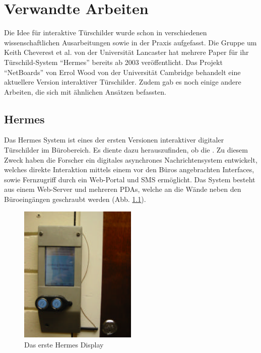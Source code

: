 \chapter{Verwandte Arbeiten}
Die Idee für interaktive Türschilder wurde schon in verschiedenen wissenschaftlichen Ausarbeitungen sowie in der Praxis aufgefasst.
Die Gruppe um Keith Cheverest et al. von der Universität Lancaster hat mehrere Paper für ihr Türschild-System ``Hermes''\cite{cheverest:2003:paper} bereits ab 2003 veröffentlicht.
Das Projekt ``NetBoards'' von Errol Wood\cite{wood:2014} von der Universität Cambridge behandelt eine aktuellere Version interaktiver Türschilder.
Zudem gab es noch einige andere Arbeiten, die sich mit ähnlichen Ansätzen befassten.

\section{Hermes}
Das Hermes System\cite{cheverest:2003:paper}\cite{cheverest:2003:article}\cite{cheveres:2005:hermes-bluetooth} ist eines der ersten Versionen interaktiver digitaler Türschilder im Bürobereich.
Es diente dazu herauszufinden, ob die \cite{cheverest:2003:paper}\cite{cheverest:2003:article}.
Zu diesem Zweck haben die Forscher ein digitales asynchrones Nachrichtensystem entwickelt, welches direkte Interaktion mittels einem vor den Büros angebrachten Interfaces, sowie Fernzugriff durch ein Web-Portal und SMS ermöglicht.
Das System besteht aus einem Web-Server und mehreren PDAs, welche an die Wände neben den Büroeingängen geschraubt werden (Abb. \ref{img:hermesDisplay}).
\begin{figure}[h!]
  \centering
  \includegraphics[width=0.5\textwidth]{./img/hermes_display.png}
  \caption{Das erste Hermes Display\cite{cheverest:2003:paper}}
  \label{img:hermesDisplay}
\end{figure}
